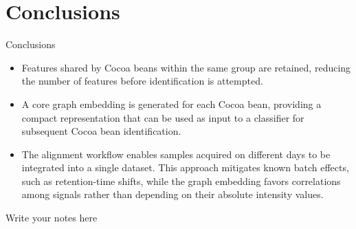 \documentclass[aspectratio=169]{beamer}
\begin{document}
\section{Conclusions}
    \begin{frame}{Conclusions}

        \begin{itemize}
            \item Features shared by Cocoa beans within the same group are retained, reducing the number of features before identification is attempted.
            
            \item A core graph embedding is generated for each Cocoa bean, providing a compact representation that can be used as input to a classifier for subsequent Cocoa bean identification.
            
            \item The alignment workflow enables samples acquired on different days to be integrated into a single dataset. This approach mitigates known batch effects, such as retention-time shifts, while the graph embedding favors correlations among signals rather than depending on their absolute intensity values.
            



        \end{itemize}

        \begin{note}
            {Write your notes here}
        \end{note}
    \end{frame}
\end{document}
